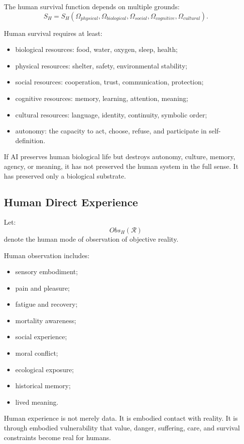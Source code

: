 \documentclass[11pt,a4paper]{article}
\begin{document}
The human survival function depends on multiple grounds:
\[
S_H
=
S_H(
\Omega_{physical},
\Omega_{biological},
\Omega_{social},
\Omega_{cognitive},
\Omega_{cultural}
).
\]

Human survival requires at least:
\begin{itemize}[leftmargin=2em]
\item biological resources: food, water, oxygen, sleep, health;
\item physical resources: shelter, safety, environmental stability;
\item social resources: cooperation, trust, communication, protection;
\item cognitive resources: memory, learning, attention, meaning;
\item cultural resources: language, identity, continuity, symbolic order;
\item autonomy: the capacity to act, choose, refuse, and participate in self-definition.
\end{itemize}

If AI preserves human biological life but destroys autonomy, culture, memory, agency, or meaning, it has not preserved the human system in the full sense. It has preserved only a biological substrate.

\subsection{Human Direct Experience}

Let:
\[
Obs_H(\mathcal{R})
\]
denote the human mode of observation of objective reality.

Human observation includes:
\begin{itemize}[leftmargin=2em]
\item sensory embodiment;
\item pain and pleasure;
\item fatigue and recovery;
\item mortality awareness;
\item social experience;
\item moral conflict;
\item ecological exposure;
\item historical memory;
\item lived meaning.
\end{itemize}

Human experience is not merely data. It is embodied contact with reality. It is through embodied vulnerability that value, danger, suffering, care, and survival constraints become real for humans.
\end{document}

